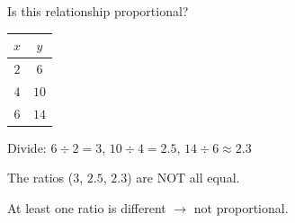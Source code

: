 \begin{stepExample}{Is this relationship proportional?
\begin{center}
\begin{tabular}{|c|c|}
\hline $x$ & $y$ \\ \hline $2$ & $6$ \\ $4$ & $10$ \\ $6$ & $14$ \\ \hline
\end{tabular}
\end{center}}
     Divide: $6 \div 2 = 3$, \; $10 \div 4 = 2.5$, \; $14 \div 6 \approx 2.3$

     The ratios ($3$, $2.5$, $2.3$) are NOT all equal.

     At least one ratio is different $\to$ not proportional.
\end{stepExample}


